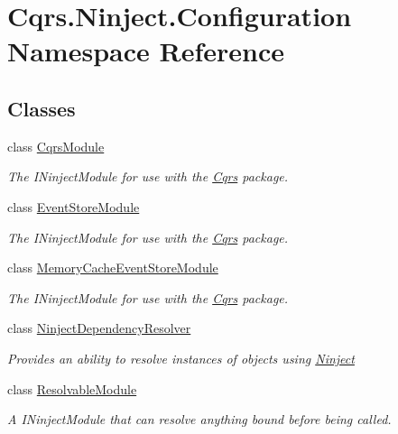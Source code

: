 \hypertarget{namespaceCqrs_1_1Ninject_1_1Configuration}{}\section{Cqrs.\+Ninject.\+Configuration Namespace Reference}
\label{namespaceCqrs_1_1Ninject_1_1Configuration}
\subsection*{Classes}
\begin{DoxyCompactItemize}
\item 
class \hyperlink{classCqrs_1_1Ninject_1_1Configuration_1_1CqrsModule}{Cqrs\+Module}
\begin{DoxyCompactList}\small\item\em The I\+Ninject\+Module for use with the \hyperlink{namespaceCqrs}{Cqrs} package. \end{DoxyCompactList}\item 
class \hyperlink{classCqrs_1_1Ninject_1_1Configuration_1_1EventStoreModule}{Event\+Store\+Module}
\begin{DoxyCompactList}\small\item\em The I\+Ninject\+Module for use with the \hyperlink{namespaceCqrs}{Cqrs} package. \end{DoxyCompactList}\item 
class \hyperlink{classCqrs_1_1Ninject_1_1Configuration_1_1MemoryCacheEventStoreModule}{Memory\+Cache\+Event\+Store\+Module}
\begin{DoxyCompactList}\small\item\em The I\+Ninject\+Module for use with the \hyperlink{namespaceCqrs}{Cqrs} package. \end{DoxyCompactList}\item 
class \hyperlink{classCqrs_1_1Ninject_1_1Configuration_1_1NinjectDependencyResolver}{Ninject\+Dependency\+Resolver}
\begin{DoxyCompactList}\small\item\em Provides an ability to resolve instances of objects using \hyperlink{namespaceCqrs_1_1Ninject}{Ninject} \end{DoxyCompactList}\item 
class \hyperlink{classCqrs_1_1Ninject_1_1Configuration_1_1ResolvableModule}{Resolvable\+Module}
\begin{DoxyCompactList}\small\item\em A I\+Ninject\+Module that can resolve anything bound before being called. \end{DoxyCompactList}\item 

\end{DoxyCompactItemize}
